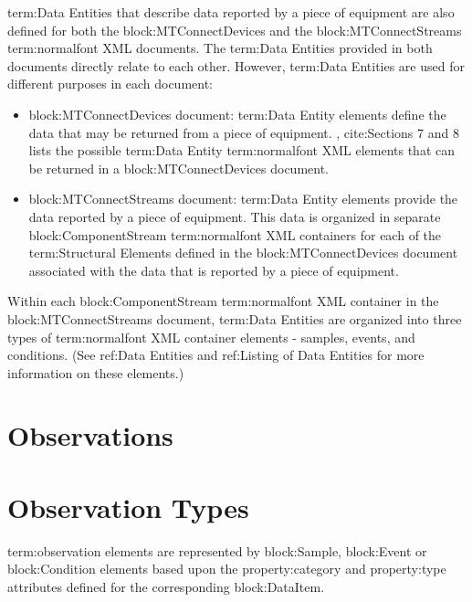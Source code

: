 {term:Data Entities} that describe data reported by a piece of equipment are also defined for both the {block:MTConnectDevices} and the {block:MTConnectStreams} {term:normalfont XML} documents.  The {term:Data Entities} provided in both documents directly relate to each other.  However, {term:Data Entities} are used for different purposes in each document:

\begin{itemize}
\item {block:MTConnectDevices} document: {term:Data Entity} elements define the data that may be returned from a piece of equipment.  , {cite:Sections 7 and 8} lists the possible {term:Data Entity} {term:normalfont XML} elements that can be returned in a {block:MTConnectDevices} document.  

\item {block:MTConnectStreams} document: {term:Data Entity} elements provide the data reported by a piece of equipment.  This data is organized in separate {block:ComponentStream} {term:normalfont XML} containers for each of the {term:Structural Elements} defined in the {block:MTConnectDevices} document associated with the data that is reported by a piece of equipment.  
\end{itemize}

Within each {block:ComponentStream} {term:normalfont XML} container in the {block:MTConnectStreams} document, {term:Data Entities} are organized into three types of {term:normalfont XML} container elements - \glspl{sample}, \glspl{event}, and \glspl{condition}.  (See {ref:Data Entities} and {ref:Listing of Data Entities} for more information on these elements.)


\section{Observations}
\label{sec:Observations}




\section{Observation Types}
\label{sec:Observation Types}
{term:observation} elements are represented by {block:Sample}, {block:Event} or {block:Condition} elements based upon the {property:category} and {property:type} attributes defined for the corresponding {block:DataItem}.



